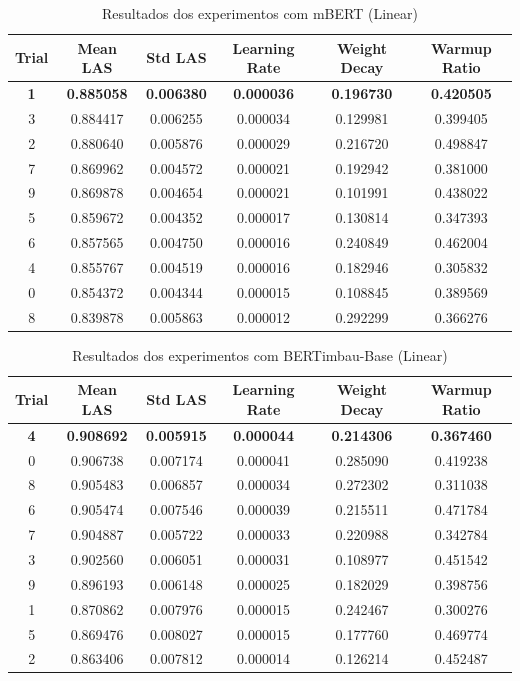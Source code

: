 \begin{table}[ht]
\centering
\caption{Resultados dos experimentos com mBERT (Linear)}
\label{tab:mbert-results}
\begin{tabular}{c c c c c c}
\hline
\textbf{Trial} & \textbf{Mean LAS} & \textbf{Std LAS} & \textbf{Learning Rate} & \textbf{Weight Decay} & \textbf{Warmup Ratio} \\
\hline
\textbf{1} & \textbf{0.885058} & \textbf{0.006380} & \textbf{0.000036} & \textbf{0.196730} & \textbf{0.420505} \\
3 & 0.884417 & 0.006255 & 0.000034 & 0.129981 & 0.399405 \\
2 & 0.880640 & 0.005876 & 0.000029 & 0.216720 & 0.498847 \\
7 & 0.869962 & 0.004572 & 0.000021 & 0.192942 & 0.381000 \\
9 & 0.869878 & 0.004654 & 0.000021 & 0.101991 & 0.438022 \\
5 & 0.859672 & 0.004352 & 0.000017 & 0.130814 & 0.347393 \\
6 & 0.857565 & 0.004750 & 0.000016 & 0.240849 & 0.462004 \\
4 & 0.855767 & 0.004519 & 0.000016 & 0.182946 & 0.305832 \\
0 & 0.854372 & 0.004344 & 0.000015 & 0.108845 & 0.389569 \\
8 & 0.839878 & 0.005863 & 0.000012 & 0.292299 & 0.366276 \\
\hline
\end{tabular}
\end{table}

\begin{table}[ht]
\centering
\caption{Resultados dos experimentos com BERTimbau-Base (Linear)}
\label{tab:bertimbau-base-results}
\begin{tabular}{c c c c c c}
\hline
\textbf{Trial} & \textbf{Mean LAS} & \textbf{Std LAS} & \textbf{Learning Rate} & \textbf{Weight Decay} & \textbf{Warmup Ratio} \\
\hline
\textbf{4} & \textbf{0.908692} & \textbf{0.005915} & \textbf{0.000044} & \textbf{0.214306} & \textbf{0.367460} \\
0 & 0.906738 & 0.007174 & 0.000041 & 0.285090 & 0.419238 \\
8 & 0.905483 & 0.006857 & 0.000034 & 0.272302 & 0.311038 \\
6 & 0.905474 & 0.007546 & 0.000039 & 0.215511 & 0.471784 \\
7 & 0.904887 & 0.005722 & 0.000033 & 0.220988 & 0.342784 \\
3 & 0.902560 & 0.006051 & 0.000031 & 0.108977 & 0.451542 \\
9 & 0.896193 & 0.006148 & 0.000025 & 0.182029 & 0.398756 \\
1 & 0.870862 & 0.007976 & 0.000015 & 0.242467 & 0.300276 \\
5 & 0.869476 & 0.008027 & 0.000015 & 0.177760 & 0.469774 \\
2 & 0.863406 & 0.007812 & 0.000014 & 0.126214 & 0.452487 \\
\hline
\end{tabular}
\end{table}



